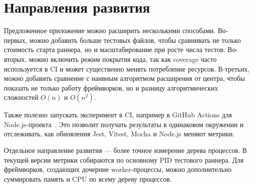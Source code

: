 \chapter{Направления развития} \label{ch6}

Предложенное приложение можно расширить несколькими способами. Во-первых, можно добавить больше тестовых файлов, чтобы сравнивать не только стоимость старта раннера, но и масштабирование при росте числа тестов. Во-вторых, можно включить режим покрытия кода, так как coverage часто используется в CI и может существенно менять потребление ресурсов. В-третьих, можно добавить сравнение с наивным алгоритмом расширения от центра, чтобы показать не только работу фреймворков, но и разницу алгоритмических сложностей $O(n)$ и $O(n^2)$.

Также полезно запускать эксперимент в CI, например в GitHub Actions для Node.js-проекта~\cite{github-actions-node}. Это позволит получать результаты в одинаковом окружении и отслеживать, как обновления Jest, Vitest, Mocha и Node.js меняют метрики.

Отдельное направление развития --- более точное измерение дерева процессов. В текущей версии метрики собираются по основному PID тестового раннера. Для фреймворков, создающих дочерние worker-процессы, можно дополнительно суммировать память и CPU по всему дереву процессов.
